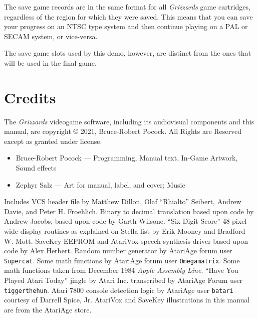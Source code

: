 \documentclass[10pt,twocolumn,openany,article]{memoir}
\begin{document}
\begin{description}
The save game records are in the same format for all \textit{Grizzards} game
cartridges, regardless of the region for which they were saved.  This means
that you can save your progress on an NTSC type system and then continue
playing on a PAL or SECAM system, or vice-versa.

\ifdefined\DEMO

The save  game slots used by  this demo, however, are  distinct from the
ones that will be used in the final game.

\fi

\fi %

\chapter{Credits}

{\small

  The  \textit{Grizzards} videogame  software,  including its  audiovisual
components   and  this   manual,   are   copyright  \copyright{}   2021,
Bruce-Robert  Pocock.   All  Rights  are  Reserved   except  as  granted
under license.

\begin{itemize}
\item Bruce-Robert Pocock --- Programming, Manual text, In-Game Artwork,
  Sound effects
\item Zephyr Salz --- Art for manual, label, and cover; Music
\end{itemize}

\bigskip


Includes VCS  header file by  Matthew Dillon, Olaf  ``Rhialto'' Seibert,
Andrew  Davie, and  Peter H.  Froehlich. Binary  to decimal  translation
based upon  code by  Andrew Jacobs,  based upon  code by  Garth Wilsone.
``Six  Digit Score''  48 pixel  wide  display routines  as explained  on
Stella list  by Erik  Mooney and  Bradford W.  Mott. SaveKey  EEPROM and
AtariVox  speech  synthesis driver  based  upon  code by  Alex  Herbert.
Random  number  generator  by  AtariAge  forum  user  \texttt{Supercat}.
Some  math  functions  by AtariAge  forum  user  \texttt{Omega\-matrix}.
Some  math functions  taken  from December  1984 \textit{Apple  Assembly
  Line}.  ``Have  You   Played  Atari  Today''  jingle   by  Atari  Inc.
transcribed by AtariAge Forum user \texttt{tigger\-the\-hun}. Atari 7800
console  detection logic  by AtariAge  user \texttt{batari}  courtesy of
Darrell Spice, Jr. AtariVox and SaveKey illustrations in this manual are
from the AtariAge store.

}
\end{description}
\end{document}
